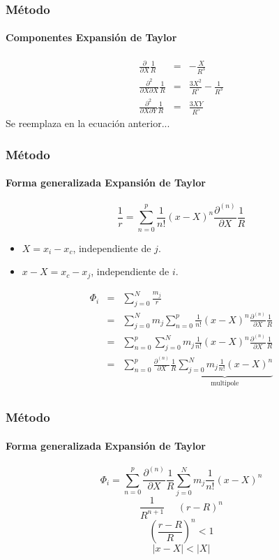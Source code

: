 \begin{frame}
    \frametitle{Método}
    \framesubtitle{Componentes Expansión de Taylor}

    \footnotesize
    \begin{eqnarray}
        \frac{\partial}{\partial X} \frac{1}{R} &=& -\frac{X}{R^{3}}\nonumber \\
        \frac{\partial^{2}}{\partial X\partial X} \frac{1}{R} &=& \frac{3X^{2}}{R^{5}} - \frac{1}{R^{3}} \nonumber\\
        \frac{\partial^{2}}{\partial X\partial Y} \frac{1}{R} &=& \frac{3XY}{R^{5}} \nonumber
    \end{eqnarray}
    \normalsize
    Se reemplaza en la ecuación anterior...
    

\end{frame}


\begin{frame}
    \frametitle{Método}
    \framesubtitle{Forma generalizada Expansión de Taylor}
    \footnotesize
    $$\frac{1}{r} = \sum_{n=0}^{p} \frac{1}{n!} (x-X)^{n}\frac{\partial^{(n)}}{\partial X} \frac{1}{R}$$
    \begin{itemize}
        \item $X = x_{i} - x_{c}$, independiente de $j$.
        \item $x - X = x_{c} - x_{j}$, independiente de $i$. 
    \end{itemize}
    \tiny
    \begin{eqnarray}
        \Phi_{i} &=& \sum_{j=0}^{N} \frac{m_{j}}{r} \nonumber \\
                 &=& \sum_{j=0}^{N} m_{j}\sum_{n=0}^{p} \frac{1}{n!}(x-X)^{n}\frac{\partial^{(n)}}{\partial X} \frac{1}{R} \nonumber \\
                 &=& \sum_{n=0}^{p} \sum_{j=0}^{N} m_{j}\frac{1}{n!}(x-X)^{n}\frac{\partial^{(n)}}{\partial X} \frac{1}{R} \nonumber \\
                 &=& \sum_{n=0}^{p} \frac{\partial^{(n)}}{\partial X} \frac{1}{R} \underbrace{\sum_{j=0}^{N} m_{j}\frac{1}{n!}(x-X)^{n}}_{\mbox{multipole}} \nonumber \\
    \end{eqnarray}
\end{frame}

\begin{frame}
    \frametitle{Método}
    \framesubtitle{Forma generalizada Expansión de Taylor}

    $$\Phi_{i} = \sum_{n=0}^{p} \frac{\partial^{(n)}}{\partial X} \frac{1}{R} \sum_{j=0}^{N} m_{j}\frac{1}{n!}(x-X)^{n} $$
    $$\frac{1}{R^{n+1}}\ \ \ \ \ \ (r-R)^{n}$$
    $$\left(\frac{r-R}{R}\right)^{n} < 1$$
    $$ |x - X| < |X|$$
    
\end{frame}


